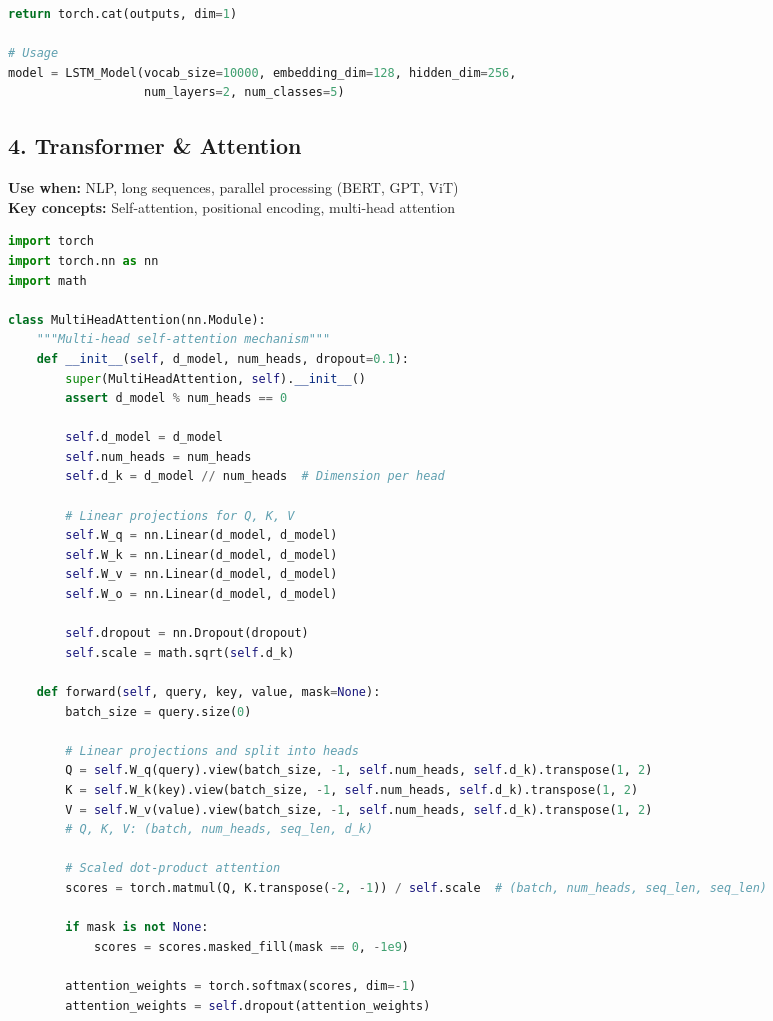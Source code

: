 \documentclass[8pt,landscape]{article}
\begin{document}
\begin{multicols}{3}
\begin{lstlisting}[language=Python]
        return torch.cat(outputs, dim=1)

# Usage
model = LSTM_Model(vocab_size=10000, embedding_dim=128, hidden_dim=256,
                   num_layers=2, num_classes=5)
\end{lstlisting}

\subsection*{4. Transformer \& Attention}
\textbf{Use when:} NLP, long sequences, parallel processing (BERT, GPT, ViT) \\
\textbf{Key concepts:} Self-attention, positional encoding, multi-head attention
\begin{lstlisting}[language=Python]
import torch
import torch.nn as nn
import math

class MultiHeadAttention(nn.Module):
    """Multi-head self-attention mechanism"""
    def __init__(self, d_model, num_heads, dropout=0.1):
        super(MultiHeadAttention, self).__init__()
        assert d_model % num_heads == 0

        self.d_model = d_model
        self.num_heads = num_heads
        self.d_k = d_model // num_heads  # Dimension per head

        # Linear projections for Q, K, V
        self.W_q = nn.Linear(d_model, d_model)
        self.W_k = nn.Linear(d_model, d_model)
        self.W_v = nn.Linear(d_model, d_model)
        self.W_o = nn.Linear(d_model, d_model)

        self.dropout = nn.Dropout(dropout)
        self.scale = math.sqrt(self.d_k)

    def forward(self, query, key, value, mask=None):
        batch_size = query.size(0)

        # Linear projections and split into heads
        Q = self.W_q(query).view(batch_size, -1, self.num_heads, self.d_k).transpose(1, 2)
        K = self.W_k(key).view(batch_size, -1, self.num_heads, self.d_k).transpose(1, 2)
        V = self.W_v(value).view(batch_size, -1, self.num_heads, self.d_k).transpose(1, 2)
        # Q, K, V: (batch, num_heads, seq_len, d_k)

        # Scaled dot-product attention
        scores = torch.matmul(Q, K.transpose(-2, -1)) / self.scale  # (batch, num_heads, seq_len, seq_len)

        if mask is not None:
            scores = scores.masked_fill(mask == 0, -1e9)

        attention_weights = torch.softmax(scores, dim=-1)
        attention_weights = self.dropout(attention_weights)


\end{lstlisting}
\end{multicols}
\end{document}
